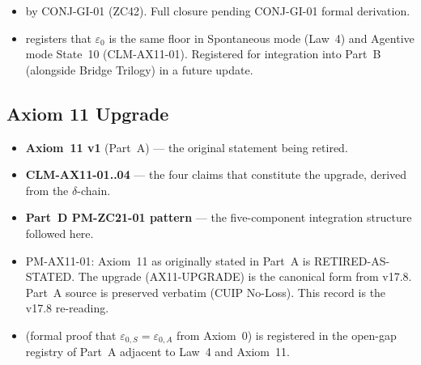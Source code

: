 \documentclass[12pt, a4paper]{article}
\begin{document}
\begin{correctionbox}
\begin{itemize}[leftmargin=*, noitemsep]
\item {} by CONJ-GI-01 (ZC42). Full
  closure pending CONJ-GI-01 formal derivation.
\item {} registers that
  $\varepsilon_0$ is the same floor in Spontaneous mode
  (Law~4) and Agentive mode State~10 (CLM-AX11-01).
  Registered for integration into Part~B (alongside
  Bridge Trilogy) in a future update.
\end{itemize}
\end{correctionbox}

\subsection{Axiom 11 Upgrade}

\begin{inheritbox}
\begin{itemize}[leftmargin=*, noitemsep]
\item \textbf{Axiom~11 v1} (Part~A) --- the original
  statement being retired.
\item \textbf{CLM-AX11-01..04} --- the four claims that
  constitute the upgrade, derived from the $\delta$-chain.
\item \textbf{Part~D PM-ZC21-01 pattern} ---
  the five-component integration structure followed here.
\end{itemize}
\end{inheritbox}

\begin{correctionbox}
\begin{itemize}[leftmargin=*, noitemsep]
\item {}
  PM-AX11-01: Axiom~11 as originally stated in Part~A
  is RETIRED-AS-STATED. The upgrade (AX11-UPGRADE) is
  the canonical form from v17.8. Part~A source is
  preserved verbatim (CUIP No-Loss). This record is the
  v17.8 re-reading.
\item {} (formal proof
  that $\varepsilon_{0,S} = \varepsilon_{0,A}$ from
  Axiom~0) is registered in the open-gap registry of
  Part~A adjacent to Law~4 and Axiom~11.
\end{itemize}
\end{correctionbox}

\newpage
\end{document}
